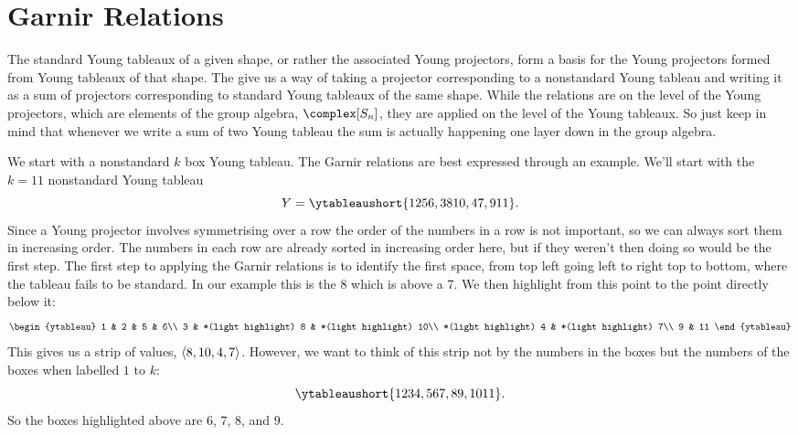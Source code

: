 \documentclass[fleqn]{NotesClass}
\newcommand{\symmetricGroup}[1][n]{S_{#1}}
\DeclarePairedDelimiter{\tuple}{\langle}{\rangle}
\begin{document}
    \section{Garnir Relations}
    The standard Young tableaux of a given shape, or rather the associated Young projectors, form a basis for the Young projectors formed from Young tableaux of that shape.
    The  give us a way of taking a projector corresponding to a nonstandard Young tableau and writing it as a sum of projectors corresponding to standard Young tableaux of the same shape.
    While the relations are on the level of the Young projectors, which are elements of the group algebra, \(\complex[\symmetricGroup]\), they are applied on the level of the Young tableaux.
    So just keep in mind that whenever we write a sum of two Young tableau the sum is actually happening one layer down in the group algebra.
    
    We start with a nonstandard \(k\) box Young tableau.
    The Garnir relations are best expressed through an example.
    We'll start with the \(k = 11\) nonstandard Young tableau
    \begin{equation}
        Y = \ytableaushort{1256,38{10},47,9{11}}.
    \end{equation}
    Since a Young projector involves symmetrising over a row the order of the numbers in a row is not important, so we can always sort them in increasing order.
    The numbers in each row are already sorted in increasing order here, but if they weren't then doing so would be the first step.
    The first step to applying the Garnir relations is to identify the first space, from top left going left to right top to bottom, where the tableau fails to be standard.
    In our example this is the 8 which is above a 7.
    We then highlight from this point to the point directly below it:
    \begin{equation}
        \begin{ytableau}
            1 & 2 & 5 & 6\\
            3 & *(light highlight) 8 & *(light highlight) 10\\
            *(light highlight) 4 & *(light highlight) 7\\
            9 & 11
        \end{ytableau}
    \end{equation}
    This gives us a strip of values, \(\tuple{8,10,4,7}\).
    However, we want to think of this strip not by the numbers in the boxes but the numbers of the boxes when labelled \(1\) to \(k\):
    \begin{equation}
        \ytableaushort{1234,567,89,{10}{11}}.
    \end{equation}
    So the boxes highlighted above are \(6\), \(7\), \(8\), and \(9\).
    
\end{document}
